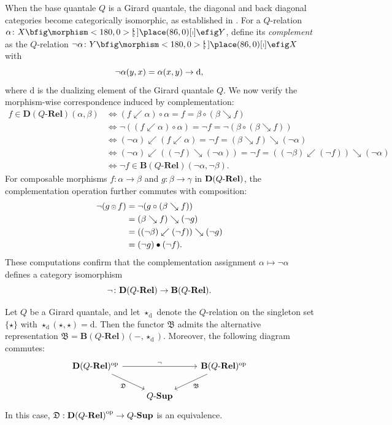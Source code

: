 \documentclass{tac}
\begin{document}
When the base quantale $Q$ is a Girard quantale, the diagonal and back diagonal categories become categorically isomorphic, as established in \cite{Shen2021}. For a $Q$-relation $\alpha\colon X\nto Y$, define its \emph{complement} as the $Q$-relation $\neg\alpha\colon Y\nto X$ with
\[
\neg\alpha(y,x)=\alpha(x,y)\rightarrow\mathrm{d},
\]
where $\mathrm{d}$ is the dualizing element of the Girard quantale $Q$. We now verify the morphism-wise correspondence induced by complementation:
\begin{align*}
f\in\mathbf{D}(Q\text{-}\mathbf{Rel})(\alpha,\beta)
&\iff (f\swarrow\alpha)\circ\alpha=f=\beta\circ(\beta\searrow f)\\
&\iff \neg((f\swarrow\alpha)\circ\alpha)=\neg f=\neg(\beta\circ(\beta\searrow f))\\
&\iff (\neg\alpha)\swarrow(f\swarrow\alpha)=\neg f=(\beta\searrow f)\searrow(\neg\alpha)\\
&\iff (\neg\alpha)\swarrow((\neg f)\searrow(\neg\alpha))=\neg f=((\neg\beta)\swarrow(\neg f))\searrow(\neg\alpha)\\
&\iff \neg f\in\mathbf{B}(Q\text{-}\mathbf{Rel})(\neg\alpha,\neg\beta).
\end{align*}
For composable morphisms $f\colon\alpha\to\beta$ and $g\colon\beta\to\gamma$ in $\mathbf{D}(Q\text{-}\mathbf{Rel})$, the complementation operation further commutes with composition:
\begin{align*}
\neg(g{\,{\scriptstyle\odot}\,} f)&=\neg(g\circ(\beta\searrow f))\\
&=(\beta\searrow f)\searrow(\neg g)\\
&=((\neg\beta)\swarrow(\neg f))\searrow(\neg g)\\
&=(\neg g)\bullet(\neg f).
\end{align*}
These computations confirm that the complementation assignment $\alpha\mapsto\neg\alpha$ defines a category isomorphism
\[
\neg\colon {\mathbf{D}(Q\text{-}\mathbf{Rel})}\to{\mathbf{B}(Q\text{-}\mathbf{Rel})}.
\]

\begin{lemma} \label{lem:girard-b}
Let $Q$ be a Girard quantale, and let $\star_\mathrm{d}$ denote the $Q$-relation on the singleton set $\{\star\}$ with $\star_\mathrm{d}(\star,\star)=\mathrm{d}$. Then the functor $\mathfrak{B}$ admits the alternative representation $\mathfrak{B}=\mathbf{B}(Q\text{-}\mathbf{Rel})(-,\star_\mathrm{d})$. Moreover, the following diagram commutes:
\[
\begin{tikzcd}
\mathbf{D}(Q\text{-}\mathbf{Rel})^{\mathrm{op}}
\arrow{rr}{\neg} \arrow{dr}[swap]{\mathfrak{D}} &&
\mathbf{B}(Q\text{-}\mathbf{Rel})^{\mathrm{op}} \arrow{dl}{\mathfrak{B}} \\
& \QSup &
\end{tikzcd}
\]
In this case, $\mathfrak{D}:{\mathbf{D}(Q\text{-}\mathbf{Rel})}^{\mathrm{op}}\to{Q\text{-}\mathbf{Sup}}$ is an equivalence. 
\end{lemma}
\end{document}
